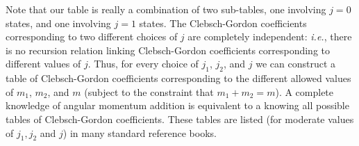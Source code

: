 Note that our table is really a combination of two sub-tables, one involving
$j=0$ states, and one involving $j=1$ states. The Clebsch-Gordon coefficients
corresponding to two different choices of $j$ are completely independent:
{\em i.e.}, there is no recursion relation linking Clebsch-Gordon coefficients
corresponding to different values of $j$. Thus, for every choice of $j_1$, $j_2$,
and $j$ we can construct a table of Clebsch-Gordon coefficients corresponding
to the different allowed values of $m_1$, $m_2$, and $m$ (subject to the
constraint that $m_1+m_2=m$). A complete knowledge of angular momentum addition
is equivalent to a knowing all possible tables of Clebsch-Gordon coefficients.
These tables are listed (for moderate values of
$j_1, j_2$ and $j$) in many standard reference books. 
